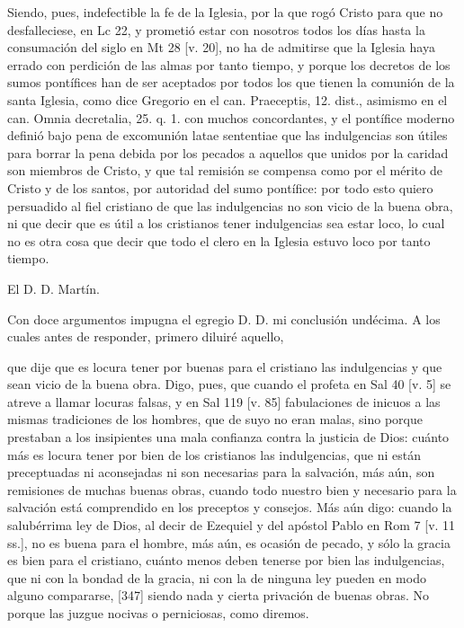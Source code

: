 Siendo, pues, indefectible la fe de la Iglesia, por la que rogó Cristo para que no desfalleciese, en Lc 22, y prometió estar con nosotros todos los días hasta la consumación del siglo en Mt 28 [v. 20], no ha de admitirse que la Iglesia haya errado con perdición de las almas por tanto tiempo, y porque los decretos de los sumos pontífices han de ser aceptados por todos los que tienen la comunión de la santa Iglesia, como dice Gregorio en el can. Praeceptis, 12. dist., asimismo en el can. Omnia decretalia, 25. q. 1. con muchos concordantes, y el pontífice moderno definió bajo pena de excomunión latae sententiae que las indulgencias son útiles para borrar la pena debida por los pecados a aquellos que unidos por la caridad son miembros de Cristo, y que tal remisión se compensa como por el mérito de Cristo y de los santos, por autoridad del sumo pontífice: por todo esto quiero persuadido al fiel cristiano de que las indulgencias no son vicio de la buena obra, ni que decir que es útil a los cristianos tener indulgencias sea estar loco, lo cual no es otra cosa que decir que todo el clero en la Iglesia estuvo loco por tanto tiempo.

El D. D. Martín.

Con doce argumentos impugna el egregio D. D. mi conclusión undécima. A los cuales antes de responder, primero diluiré aquello,

que dije que es locura tener por buenas para el cristiano las indulgencias y que sean vicio de la buena obra. Digo, pues, que cuando el profeta en Sal 40 [v. 5] se atreve a llamar locuras falsas, y en Sal 119 [v. 85] fabulaciones de inicuos a las mismas tradiciones de los hombres, que de suyo no eran malas, sino porque prestaban a los insipientes una mala confianza contra la justicia de Dios: cuánto más es locura tener por bien de los cristianos las indulgencias, que ni están preceptuadas ni aconsejadas ni son necesarias para la salvación, más aún, son remisiones de muchas buenas obras, cuando todo nuestro bien y necesario para la salvación está comprendido en los preceptos y consejos. Más aún digo: cuando la salubérrima ley de Dios, al decir de Ezequiel y del apóstol Pablo en Rom 7 [v. 11 ss.], no es buena para el hombre, más aún, es ocasión de pecado, y sólo la gracia es bien para el cristiano, cuánto menos deben tenerse por bien las indulgencias, que ni con la bondad de la gracia, ni con la de ninguna ley pueden en modo alguno compararse, [347] siendo nada y cierta privación de buenas obras. No porque las juzgue nocivas o perniciosas, como diremos.

